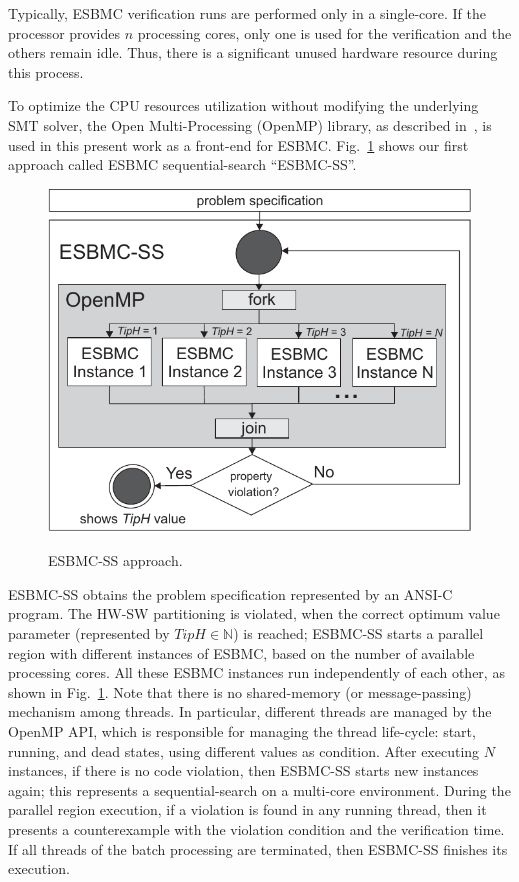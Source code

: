 \documentclass{doublecol-new}
\theoremstyle{TH}{
\newtheorem{lemma}{Lemma}
\newtheorem{theorem}[lemma]{Theorem}
\newtheorem{corrolary}[lemma]{Corrolary}
\newtheorem{conjecture}[lemma]{Conjecture}
\newtheorem{proposition}[lemma]{Proposition}
\newtheorem{claim}[lemma]{Claim}
\newtheorem{stheorem}[lemma]{Wrong Theorem}
\newtheorem{algorithm}{Algorithm}
}
\theoremstyle{THrm}{
\newtheorem{definition}{Definition}[section]
\newtheorem{question}{Question}[section]
\newtheorem{remark}{Remark}
\newtheorem{scheme}{Scheme}
}
\theoremstyle{THhit}{
\newtheorem{case}{Case}[section]
}
\begin{document}
Typically, ESBMC verification runs are performed only in a single-core. If the processor provides $n$ processing cores, only one is used for the verification and the others remain idle. Thus, there is a significant unused hardware resource during this process. 

To optimize the CPU resources utilization without modifying the underlying SMT solver, the Open Multi-Processing (OpenMP) library, as described in~\cite{Dagum1998}, is used in this present work as a front-end for ESBMC. Fig.~\ref{ESBMC-Multi-core} shows our first approach called ESBMC sequential-search ``ESBMC-SS''.

\begin{figure}[h]
	\caption{ESBMC-SS approach.}
	\centering
	\includegraphics[scale=0.77]{figures/esbmc-ss.pdf} 	
	\label{ESBMC-Multi-core}
\end{figure}

ESBMC-SS obtains the problem specification represented by an ANSI-C program. The HW-SW partitioning is violated, when the correct optimum value parameter (represented by $TipH \in \mathbb{N}$) is reached; ESBMC-SS starts a parallel region with different instances of ESBMC, based on the number of available processing cores. All these ESBMC instances run independently of each other, as shown in Fig.~\ref{ESBMC-Multi-core}. Note that there is no shared-memory (or message-passing) mechanism among threads. In particular, different threads are managed by the OpenMP API, which is responsible for managing the thread life-cycle: start, running, and dead states, using different values as condition. After executing $N$ instances, if there is no code violation, then ESBMC-SS starts new instances again; this represents a sequential-search on a multi-core environment. During the parallel region execution, if a violation is found in any running thread, then it presents a counterexample with the violation condition and the verification time. If all threads of the batch processing are terminated, then ESBMC-SS finishes its execution.
\end{document}
